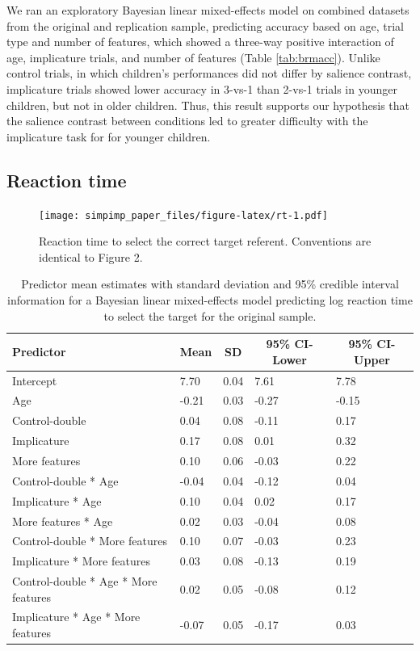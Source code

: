 \documentclass[man]{apa6}
\begin{document}
We ran an exploratory Bayesian linear mixed-effects model on combined
datasets from the original and replication sample, predicting accuracy
based on age, trial type and number of features, which showed a
three-way positive interaction of age, implicature trials, and number of
features (Table \ref{tab:brmacc}). Unlike control trials, in which
children's performances did not differ by salience contrast, implicature
trials showed lower accuracy in 3-vs-1 than 2-vs-1 trials in younger
children, but not in older children. Thus, this result supports our
hypothesis that the salience contrast between conditions led to greater
difficulty with the implicature task for for younger children.

\subsection{Reaction time}\label{reaction-time}

\begin{figure}
\centering
\texttt{[image: simpimp\_paper\_files/figure-latex/rt-1.pdf]}
\caption{\label{fig:rt}Reaction time to select the correct target referent.
Conventions are identical to Figure 2.}
\end{figure}

\begin{table}[tbp]
\begin{center}
\begin{threeparttable}
\caption{\label{tab:brmrtSample1}Predictor mean estimates with standard deviation and 95\% credible interval information for a Bayesian linear mixed-effects model predicting log reaction time to select the target for the original sample.}
\begin{tabular}{lllll}
\toprule
Predictor & \multicolumn{1}{c}{Mean} & \multicolumn{1}{c}{SD} & \multicolumn{1}{c}{95\% CI-Lower} & \multicolumn{1}{c}{95\% CI-Upper}\\
\midrule
Intercept & 7.70 & 0.04 & 7.61 & 7.78\\
Age & -0.21 & 0.03 & -0.27 & -0.15\\
Control-double & 0.04 & 0.08 & -0.11 & 0.17\\
Implicature & 0.17 & 0.08 & 0.01 & 0.32\\
More features & 0.10 & 0.06 & -0.03 & 0.22\\
Control-double * Age & -0.04 & 0.04 & -0.12 & 0.04\\
Implicature * Age & 0.10 & 0.04 & 0.02 & 0.17\\
More features * Age & 0.02 & 0.03 & -0.04 & 0.08\\
Control-double * More features & 0.10 & 0.07 & -0.03 & 0.23\\
Implicature * More features & 0.03 & 0.08 & -0.13 & 0.19\\
Control-double * Age * More features & 0.02 & 0.05 & -0.08 & 0.12\\
Implicature * Age * More features & -0.07 & 0.05 & -0.17 & 0.03\\
\bottomrule
\end{tabular}
\end{threeparttable}
\end{center}
\end{table}
\end{document}
